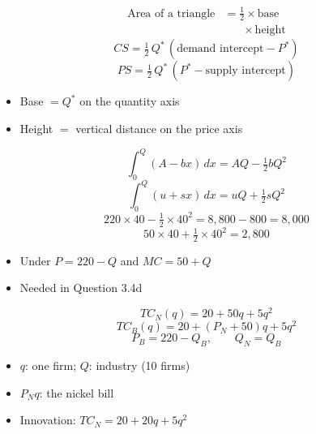 \begin{frame}[plain,label=w2_04_triangle]
  \Large
  \begin{align*}
    \tag{9}\;\text{Area of a triangle} &= \tfrac{1}{2} \times \text{base}\\
                                       &\phantom{=}\; \times \text{height}
  \end{align*}
  \[
    \tag{10}\;CS = \tfrac{1}{2}\, Q^* \,(\text{demand intercept} - P^*)
  \]
  \[
    \tag{11}\;PS = \tfrac{1}{2}\, Q^* \,(P^* - \text{supply intercept})
  \]

  \vspace{0.75em}
  \begin{itemize}\Large
    \item Base $= Q^*$ on the quantity axis
    \item Height $=$ vertical distance on the price axis
  \end{itemize}
\end{frame}

\begin{frame}[plain,label=w2_05_arealine]
  \Large
  \[
    \tag{12}\;\int_0^{Q} (A - bx)\,dx = AQ - \tfrac{1}{2} b Q^2
  \]
  \[
    \tag{13}\;\int_0^{Q} (u + sx)\,dx = uQ + \tfrac{1}{2} s Q^2
  \]
  \[
    \tag{14}\;220 \times 40 - \tfrac{1}{2} \times 40^2 = 8{,}800 - 800 = 8{,}000
  \]
  \[
    \tag{15}\;50 \times 40 + \tfrac{1}{2} \times 40^2 = 2{,}800
  \]

  \vspace{0.3em}
  \begin{itemize}\Large
    \item Under $P = 220 - Q$ and $MC = 50 + Q$
    \item Needed in Question 3.4d
  \end{itemize}
\end{frame}

\begin{frame}[plain,label=w2_06_model]
  \Large
  \[
    \tag{16}\;TC_N(q) = 20 + 50q + 5q^2
  \]
  \[
    \tag{17}\;TC_B(q) = 20 + (P_N + 50)q + 5q^2
  \]
  \[
    \tag{18}\;P_B = 220 - Q_B, \qquad Q_N = Q_B
  \]

  \vspace{0.5em}
  \begin{itemize}\Large
    \item $q$: one firm; $Q$: industry (10 firms)
    \item $P_N q$: the nickel bill
    \item Innovation: $TC_N = 20 + 20q + 5q^2$
  \end{itemize}
\end{frame}

